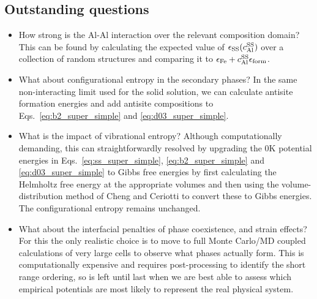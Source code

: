 \subsection{Outstanding questions}
    \label{subsec:outstanding_after_simple_conf}
    \begin{itemize}
        \item How strong is the Al-Al interaction over the relevant composition domain? This can be found by calculating the expected value of $\epsilon_{\mathrm{SS}}(c_{\mathrm{Al}}^{\mathrm{SS}})$ over a collection of random structures and comparing it to $\epsilon_{\mathrm{Fe}} + c_{\mathrm{Al}}^{\mathrm{SS}} \epsilon_{\mathrm{form}}$.
        \item What about configurational entropy in the secondary phases? In the same non-interacting limit used for the solid solution, we can calculate antisite formation energies and add antisite compositions to Eqs.~\ref{eq:b2_super_simple} and \ref{eq:d03_super_simple}. 
        \item What is the impact of vibrational entropy? Although computationally demanding, this can straightforwardly resolved by upgrading the 0K potential energies in Eqs.~\ref{eq:ss_super_simple}, \ref{eq:b2_super_simple} and \ref{eq:d03_super_simple} to Gibbs free energies by first calculating the Helmholtz free energy at the appropriate volumes and then using the volume-distribution method of Cheng and Ceriotti \cite{Cheng_Ceriotti_2018} to convert these to Gibbs energies. The configurational entropy remains unchanged.
        \item What about the interfacial penalties of phase coexistence, and strain effects? For this the only realistic choice is to move to full Monte Carlo/MD coupled calculations of very large cells to observe what phases actually form. This is computationally expensive and requires post-processing to identify the short range ordering, so is left until last when we are best able to assess which empirical potentials are most likely to represent the real physical system.
    \end{itemize}